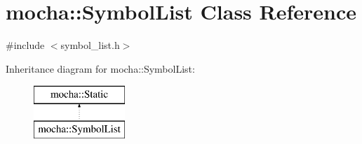 \hypertarget{classmocha_1_1_symbol_list}{
\section{mocha::SymbolList Class Reference}
\label{classmocha_1_1_symbol_list}
}


{\ttfamily \#include $<$symbol\_\-list.h$>$}

Inheritance diagram for mocha::SymbolList:\begin{figure}[H]
\begin{center}
\leavevmode
\includegraphics[height=2.000000cm]{classmocha_1_1_symbol_list}
\end{center}
\end{figure}
